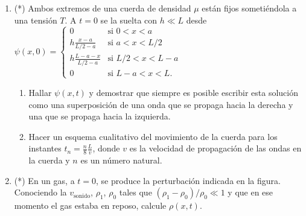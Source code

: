 \documentclass[11pt,spanish,a4paper]{article}
\begin{document}
\begin{enumerate}
\item (*) Ambos extremos de una cuerda de densidad $\mu$ están fijos sometiéndola a una tensión $T$.
A $t=0$ se la suelta con $h \ll L$ desde
$
\psi(x,0)=\begin{cases}
0 & \mbox{si }0<x<a\\
h\frac{x-a}{L/2-a} & \mbox{si }a<x<L/2\\
h\frac{L-a-x}{L/2-a} & \mbox{si }L/2<x<L-a\\
0 & \mbox{si }L-a<x<L .
\end{cases}
$
\begin{enumerate}
	\item Hallar $\psi(x,t)$ y demostrar que siempre es posible escribir esta solución como una superposición de una onda que se propaga hacia la derecha y una que se propaga hacia la izquierda.
	\item Hacer un esquema cualitativo del movimiento de la cuerda para los instantes $t_n = \frac{n}{8} \frac{L}{v}$, donde $v$ es la velocidad de propagación de las ondas en la cuerda y $n$ es un número natural.
\end{enumerate}


\item 
\begin{minipage}[t][1.5cm]{0.7\textwidth}
(*) En un gas, a $t=0$, se produce la perturbación indicada en la figura.
Conociendo la $v_\text{sonido}$, $\rho_{1}$, $\rho_{0}$ tales que $(\rho_{1}-\rho_{0})/\rho_{0}\ll1$ y que en ese momento el gas estaba en reposo, calcule $\rho(x,t)$.
\end{minipage}
\begin{minipage}[c][1.6cm][t]{0.2\textwidth}
\end{minipage}



\end{enumerate}
\end{document}
